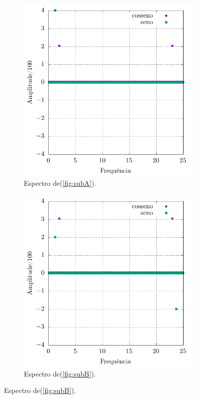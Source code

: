 \documentclass[a4paper, 11pt]{article}
\begin{document}
\begin{figure}[h!]
    \centering
    \caption{Componentes de Fourier para os sinais (\ref{fig:subA}) e (\ref{fig:subB}) em um período.}
    \begin{subfigure}{0.45\textwidth}
        \centering
        \includegraphics[width=\textwidth]{output-dft-A}
        \caption{Espectro de(\ref{fig:subA}).}
        \label{fig:espectroA}
    \end{subfigure}
    \hfill
    \begin{subfigure}{0.45\textwidth}
        \centering
        \includegraphics[width=\textwidth]{output-dft-B}
        \caption{Espectro de(\ref{fig:subB}).}
        \label{fig:espectroB}
    \end{subfigure}
        \label{fig:espectro1}
\end{figure} 
\end{document}
